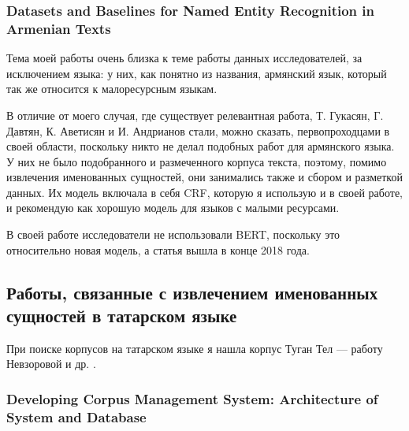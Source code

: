 \subsubsection{Datasets and Baselines for Named Entity Recognition in Armenian Texts}

Тема моей работы очень близка к теме работы данных исследователей, за исключением языка: у них, как понятно из названия, армянский язык, который так же относится к малоресурсным языкам.

В отличие от моего случая, где существует релевантная работа, Т. Гукасян, Г. Давтян, К. Аветисян и И. Андрианов стали, можно сказать, первопроходцами в своей области, поскольку никто не делал подобных работ для армянского языка. У них не было подобранного и размеченного корпуса текста, поэтому, помимо извлечения именованных сущностей, они занимались также и сбором и разметкой данных. Их модель включала в себя CRF, которую я использую и в своей работе, и рекомендую как хорошую модель для языков с малыми ресурсами.

В своей работе исследователи не использовали BERT, поскольку это относительно новая модель, а статья вышла в конце 2018 года.


\subsection{Работы, связанные с извлечением именованных сущностей в татарском языке}

При поиске корпусов на татарском языке я нашла корпус Туган Тел --- работу Невзоровой и др. \cite{tugan_tel}. %

\subsubsection{Developing Corpus Management System:
Architecture of System and Database}

